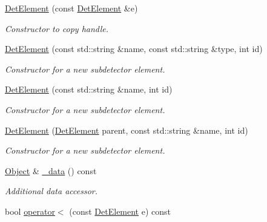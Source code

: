 \begin{DoxyCompactItemize}
\hyperlink{class_d_d4hep_1_1_geometry_1_1_det_element_a450f902a54685339175b04504da0c0fb}{DetElement} (const \hyperlink{class_d_d4hep_1_1_geometry_1_1_det_element}{DetElement} \&e)
\begin{DoxyCompactList}\small\item\em Constructor to copy handle. \item\end{DoxyCompactList}\item 
\hyperlink{class_d_d4hep_1_1_geometry_1_1_det_element_a0181dbc9668e34c3e3cd2da2ef24d878}{DetElement} (const std::string \&name, const std::string \&type, int id)
\begin{DoxyCompactList}\small\item\em Constructor for a new subdetector element. \item\end{DoxyCompactList}\item 
\hyperlink{class_d_d4hep_1_1_geometry_1_1_det_element_ad41b5493b8bd215e6b9124f4c6112f7d}{DetElement} (const std::string \&name, int id)
\begin{DoxyCompactList}\small\item\em Constructor for a new subdetector element. \item\end{DoxyCompactList}\item 
\hyperlink{class_d_d4hep_1_1_geometry_1_1_det_element_a892a3c4f3429f6ee45aeece59bc538c6}{DetElement} (\hyperlink{class_d_d4hep_1_1_geometry_1_1_det_element}{DetElement} parent, const std::string \&name, int id)
\begin{DoxyCompactList}\small\item\em Constructor for a new subdetector element. \item\end{DoxyCompactList}\item 
\hyperlink{class_d_d4hep_1_1_geometry_1_1_det_element_object}{Object} \& \hyperlink{class_d_d4hep_1_1_geometry_1_1_det_element_ae8dbb28c9b63b2500ca650c9fec0605b}{\_\-data} () const 
\begin{DoxyCompactList}\small\item\em Additional data accessor. \item\end{DoxyCompactList}\item 
bool \hyperlink{class_d_d4hep_1_1_geometry_1_1_det_element_ac8e12307da748f91b989f010b06594bd}{operator$<$} (const \hyperlink{class_d_d4hep_1_1_geometry_1_1_det_element}{DetElement} e) const 

\end{DoxyCompactItemize}
